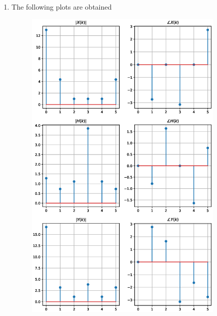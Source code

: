 \documentclass[journal,12pt,twocolumn]{IEEEtran}
\renewcommand\thesection{\arabic{section}}
\begin{document}
\begin{enumerate}[label=\thesection.\arabic*.,ref=\thesection.\theenumi]
\item The following plots are obtained
\begin{figure}[!ht]
	\includegraphics[width=9.5cm]{./figs/EE18BTECH11016.eps}
\end{figure}
\end{enumerate}
\end{document}
